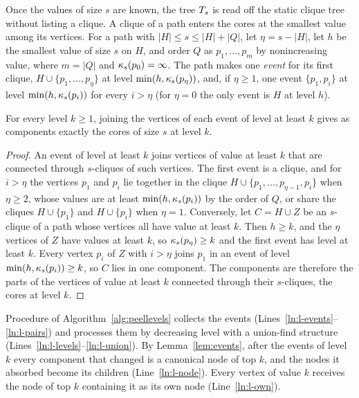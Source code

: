 Once the values of size $s$ are known, the tree $T_{s}$ is read off the static clique tree without listing a clique.
%
A clique of a path enters the cores at the smallest value among its vertices.
%
For a path with $|H|\le s\le|H|+|Q|$, let $\eta=s-|H|$, let $h$ be the smallest value of size $s$ on $H$, and order $Q$ as $p_1,\dots,p_m$ by nonincreasing value, where $m=|Q|$ and $\kappa_{s}(p_0)=\infty$.
%
The path makes one \textit{event} for its first clique, $H\cup\{p_1,\dots,p_\eta\}$ at level $\min(h,\kappa_{s}(p_\eta))$, and, if $\eta\ge1$, one event $\{p_1,p_i\}$ at level $\min(h,\kappa_{s}(p_i))$ for every $i>\eta$ (for $\eta=0$ the only event is $H$ at level $h$).
\begin{lemma}[events]\label{lem:events}
For every level $k\ge1$, joining the vertices of each event of level at least $k$ gives as components exactly the cores of size $s$ at level $k$.
\end{lemma}
\begin{proof}
An event of level at least $k$ joins vertices of value at least $k$ that are connected through $s$-cliques of such vertices.
%
The first event is a clique, and for $i>\eta$ the vertices $p_1$ and $p_i$ lie together in the clique $H\cup\{p_1,\dots,p_{\eta-1},p_i\}$ when $\eta\ge2$, whose values are at least $\min(h,\kappa_{s}(p_i))$ by the order of $Q$, or share the cliques $H\cup\{p_1\}$ and $H\cup\{p_i\}$ when $\eta=1$.
%
Conversely, let $C=H\cup Z$ be an $s$-clique of a path whose vertices all have value at least $k$.
%
Then $h\ge k$, and the $\eta$ vertices of $Z$ have values at least $k$, so $\kappa_{s}(p_\eta)\ge k$ and the first event has level at least $k$.
%
Every vertex $p_i$ of $Z$ with $i>\eta$ joins $p_1$ in an event of level $\min(h,\kappa_{s}(p_i))\ge k$, so $C$ lies in one component.
%
The components are therefore the parts of the vertices of value at least $k$ connected through their $s$-cliques, the cores at level $k$.
\end{proof}
Procedure  of Algorithm~\ref{alg:peellevels} collects the events (Lines~\ref{ln:l-events}--\ref{ln:l-pairs}) and processes them by decreasing level with a union-find structure (Lines~\ref{ln:l-levels}--\ref{ln:l-union}).
%
By Lemma~\ref{lem:events}, after the events of level $k$ every component that changed is a canonical node of top $k$, and the nodes it absorbed become its children (Line~\ref{ln:l-node}).
%
Every vertex of value $k$ receives the node of top $k$ containing it as its own node (Line~\ref{ln:l-own}).

